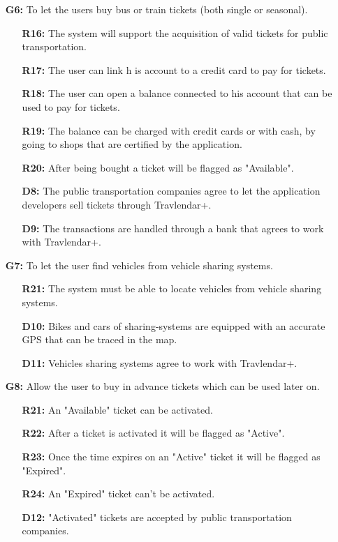 \documentclass{article}
\begin{document}
\begin{enumerate}
\begin{enumerate}
\end{enumerate}
\item[\textbf{G6:}] To let the users buy bus or train tickets (both single or seasonal).
\begin{enumerate}
\item[\textbf{R16:}] The system will support the acquisition of valid tickets for public transportation.
\item[\textbf{R17:}] The user can link h is account to a credit card to pay for tickets.
\item[\textbf{R18:}] The user can open a balance connected to his account that can be used to pay for tickets.
\item[\textbf{R19:}] The balance can be charged with credit cards or with cash, by going to shops that are certified by the application.
\item[\textbf{R20:}] After being bought a ticket will be flagged as "Available".
\item[\textbf{D8:}] The public transportation companies agree to let the application developers sell tickets through Travlendar+.
\item[\textbf{D9:}] The transactions are handled through a bank that agrees to work with Travlendar+.
\end{enumerate}
\item[\textbf{G7:}] To let the user find vehicles from vehicle sharing systems.
\begin{enumerate}
\item[\textbf{R21:}] The system must be able to locate vehicles from vehicle sharing systems.
\item[\textbf{D10:}] Bikes and cars of sharing-systems are equipped with an accurate GPS that can be traced in the map.
\item[\textbf{D11:}] Vehicles sharing systems agree to work with Travlendar+.
\end{enumerate}
\item[\textbf{G8:}] Allow the user to buy in advance tickets which can be used later on.
\begin{enumerate}
\item[\textbf{R21:}] An "Available" ticket can be activated.
\item[\textbf{R22:}] After a ticket is activated it will be flagged as "Active".
\item[\textbf{R23:}] Once the time expires on an "Active" ticket it will be flagged as "Expired".
\item[\textbf{R24:}] An "Expired" ticket can't be activated.
\item[\textbf{D12:}] "Activated" tickets are accepted by public transportation companies.
\end{enumerate}
\end{enumerate}
\end{document}
